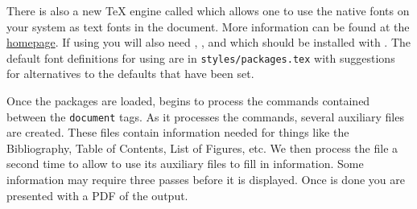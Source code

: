 There is also a new \TeX{} engine called \xt which allows one to use the native fonts on your system as text fonts in the document. More information can be found at the \href{http://scripts.sil.org/cms/scripts/page.php?site_id=nrsi&id=xetex}{\xt homepage}. If using \xt you will also need , , and  which should be installed with \xt. The default font definitions for using \xt are in \verb|styles/packages.tex| with suggestions for alternatives to the defaults that have been set.

Once the packages are loaded, \lt begins to process the commands contained between the \texttt{document} tags. As it processes the commands, several auxiliary files are created. These files contain information needed for things like the Bibliography, Table of Contents, List of Figures, etc. We then process the file a second time to allow \lt to use its auxiliary files to fill in information. Some information may require three passes before it is displayed. Once \lt is done you are presented with a PDF of the output.